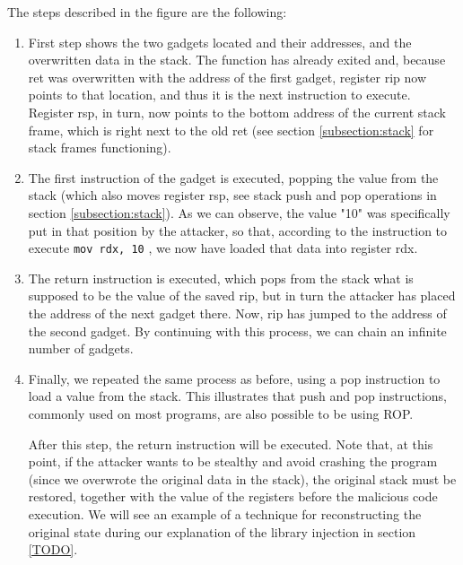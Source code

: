 \documentclass[12pt]{report} %
\begin{document}
The steps described in the figure are the following:
\begin{enumerate}
\item First step shows the two gadgets located and their addresses, and the overwritten data in the stack. The function has already exited and, because ret was overwritten with the address of the first gadget, register rip now points to that location, and thus it is the next instruction to execute. Register rsp, in turn, now points to the bottom address of the current stack frame, which is right next to the old ret (see section \ref{subsection:stack} for stack frames functioning).
\item The first instruction of the gadget is executed, popping the value from the stack (which also moves register rsp, see stack push and pop operations in section \ref{subsection:stack}). As we can observe, the value "10" was specifically put in that position by the attacker, so that, according to the instruction to execute \lstinline{mov rdx, 10} \lstinline{}, we now have loaded that data into register rdx.
\item The return instruction is executed, which pops from the stack what is supposed to be the value of the saved rip, but in turn the attacker has placed the address of the next gadget there. Now, rip has jumped to the address of the second gadget. By continuing with this process, we can chain an infinite number of gadgets.
\item Finally, we repeated the same process as before, using a pop instruction to load a value from the stack. This illustrates that push and pop instructions, commonly used on most programs, are also possible to be using ROP.

After this step, the return instruction will be executed. Note that, at this point, if the attacker wants to be stealthy and avoid crashing the program (since we overwrote the original data in the stack), the original stack must be restored, together with the value of the registers before the malicious code execution. We will see an example of a technique for reconstructing the original state during our explanation of the library injection in section \ref{TODO}.
\end{enumerate}
\end{document}
